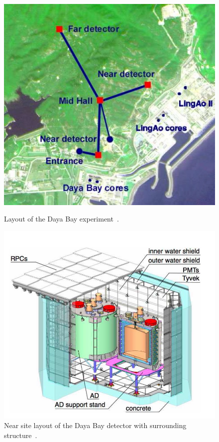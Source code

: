 \begin{figure}[h!]
  \centering
  \begin{minipage}[b]{0.49\textwidth}
    \includegraphics[width=\textwidth]{figures/DayaBay.jpeg}
    \vspace{2mm}
    \caption{Layout of the Daya Bay experiment~\cite{122An}.}
    \label{fig:DB}
  \end{minipage}
  \hfill
  \begin{minipage}[b]{0.49\textwidth}
    \includegraphics[width=\textwidth]{figures/db2.jpeg}
       \vspace{2mm}
    \caption{Near site layout of the Daya Bay detector with surrounding structure~\cite{122An}.}
     \label{fig:db2}
  \end{minipage}
\end{figure}

